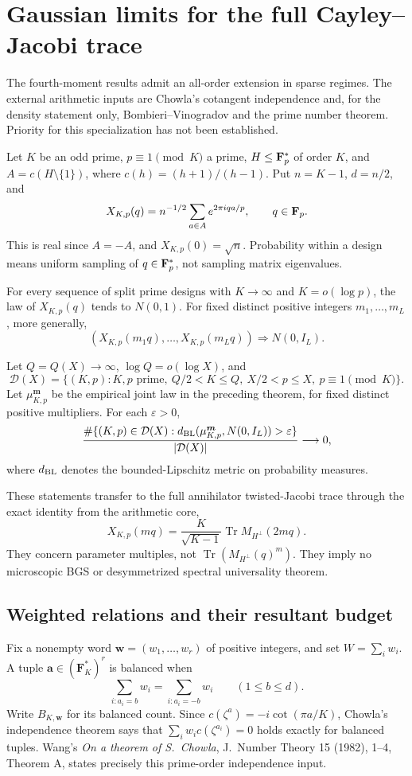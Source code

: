 \section{Gaussian limits for the full Cayley--Jacobi trace}
\label{sec:cayley-gaussian}
The fourth-moment results admit an all-order extension in sparse regimes.
The external arithmetic inputs are Chowla's cotangent independence and,
for the density statement only, Bombieri--Vinogradov and the prime number
theorem. Priority for this specialization has not been established.

Let $K$ be an odd prime, $p\equiv1\pmod K$ a prime, $H\le\mathbf F_p^*$ of order
$K$, and $A=c(H\setminus\{1\})$, where $c(h)=(h+1)/(h-1)$.
Put $n=K-1$, $d=n/2$, and
\[
 X_{K,p}(q)=n^{-1/2}\sum_{a\in A}e^{2\pi iqa/p},\qquad q\in\mathbf F_p.
\]
This is real since $A=-A$, and $X_{K,p}(0)=\sqrt n$.
Probability within a design means uniform sampling of $q\in\mathbf F_p^*$,
not sampling matrix eigenvalues.

\begin{theorem}
For every sequence of split prime designs with $K\to\infty$ and
$K=o(\log p)$, the law of $X_{K,p}(q)$ tends to $N(0,1)$.
For fixed distinct positive integers $m_1,\ldots,m_L$, more generally,
\[
 (X_{K,p}(m_1q),\ldots,X_{K,p}(m_Lq))\Longrightarrow N(0,I_L).
\]
\end{theorem}

\begin{theorem}
Let $Q=Q(X)\to\infty$, $\log Q=o(\log X)$, and
\[
 \mathcal D(X)=\{(K,p):K,p\text{ prime},\
 Q/2<K\le Q,\ X/2<p\le X,\ p\equiv1\pmod K\}.
\]
Let $\mu_{K,p}^{\boldsymbol m}$ be the empirical joint law in the preceding
theorem, for fixed distinct positive multipliers. For each $\varepsilon>0$,
\[
 \frac{\#\{(K,p)\in\mathcal D(X):
 d_{\rm BL}(\mu_{K,p}^{\boldsymbol m},N(0,I_L))>\varepsilon\}}
 {|\mathcal D(X)|}\longrightarrow0,
\]
where $d_{\rm BL}$ denotes the bounded-Lipschitz metric on probability measures.
\end{theorem}

These statements transfer to the full annihilator twisted-Jacobi trace through
the exact identity from the arithmetic core,
\[
 X_{K,p}(mq)=\frac K{\sqrt{K-1}}\operatorname{Tr}M_{H^\perp}(2mq).
\]
They concern parameter multiples, not $\operatorname{Tr}(M_{H^\perp}(q)^m)$.
They imply no microscopic BGS or desymmetrized spectral universality theorem.

\subsection{Weighted relations and their resultant budget}
Fix a nonempty word $\boldsymbol w=(w_1,\ldots,w_r)$ of positive integers,
and set $W=\sum_iw_i$. A tuple $\boldsymbol a\in(\mathbf F_K^*)^r$ is
balanced when
\[
 \sum_{i:a_i=b}w_i=\sum_{i:a_i=-b}w_i\qquad(1\le b\le d).
\]
Write $B_{K,\boldsymbol w}$ for its balanced count. Since
$c(\zeta^a)=-i\cot(\pi a/K)$, Chowla's independence theorem says that
$\sum_iw_ic(\zeta^{a_i})=0$ holds exactly for balanced tuples.
Wang's \emph{On a theorem of S.~Chowla}, J.~Number Theory 15 (1982), 1--4,
Theorem A, states precisely this prime-order independence input.

